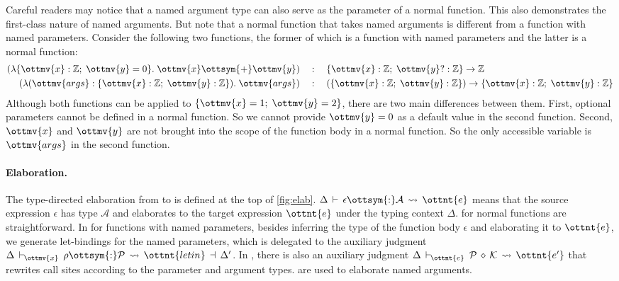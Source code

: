 Careful readers may notice that a named argument type can also serve as the
parameter of a normal function. This also demonstrates the first-class nature of
named arguments. But note that a normal function that takes named
arguments is different from a function with named parameters. Consider the
following two functions, the former of which is a function with named parameters
and the latter is a normal function:
\begin{align*}
                    (\lambda\{\ottmv{x}: \mathbb{Z} ;\;\ottmv{y}=0\}.\;\ottmv{x}  \ottsym{+}  \ottmv{y}) \quad&:\quad \{\ottmv{x}: \mathbb{Z} ;\;\ottmv{y}?: \mathbb{Z} \} \rightarrow  \mathbb{Z}  \\
  (\lambda(\ottmv{args}:\{\ottmv{x}: \mathbb{Z} ;\;\ottmv{y}: \mathbb{Z} \}).\;\ottmv{args}) \quad&:\quad (\{\ottmv{x}: \mathbb{Z} ;\;\ottmv{y}: \mathbb{Z} \}) \rightarrow \{\ottmv{x}: \mathbb{Z} ;\;\ottmv{y}: \mathbb{Z} \}
\end{align*}
Although both functions can be applied to $\{\ottmv{x}=1;\;\ottmv{y}=2\}$, there are two
main differences between them. First, optional parameters cannot be defined in a
normal function. So we cannot provide $\ottmv{y}=0$ as a default value in the second
function. Second, $\ottmv{x}$ and $\ottmv{y}$ are not brought into the scope of the
function body in a normal function. So the only accessible variable is $\ottmv{args}$
in the second function.

\paragraph{Elaboration.}
The type-directed elaboration from \uaena to \lambdaiu is defined at the top of
\autoref{fig:elab}. $\Delta  \,\vdash\,  \epsilon  \ottsym{:}  \mathcal{A}  \,\rightsquigarrow\,  \ottnt{e}$ means that the source
expression $\epsilon$ has type $\mathcal{A}$ and elaborates to the target expression
$\ottnt{e}$ under the typing context $\Delta$.  for normal
functions are straightforward. In  for functions with named
parameters, besides inferring the type of the function body $\epsilon$ and
elaborating it to $\ottnt{e}$, we generate let-bindings for the named parameters,
which is delegated to the auxiliary judgment $ \Delta \,\vdash\, _{\!\!\!\! \ottmv{x} }\:\: \rho \ottsym{:} \mathcal{P} \,\rightsquigarrow\, \ottnt{letin} \,\dashv\, \Delta' $.
In , there is also an auxiliary judgment $ \Delta \,\vdash\, _{\!\!\!\! \ottnt{e} }\:\: \mathcal{P} \,\diamond\, \mathcal{K} \,\rightsquigarrow\, \ottnt{e'} $
that rewrites call sites according to the parameter and argument types.
 are used to elaborate named arguments.

